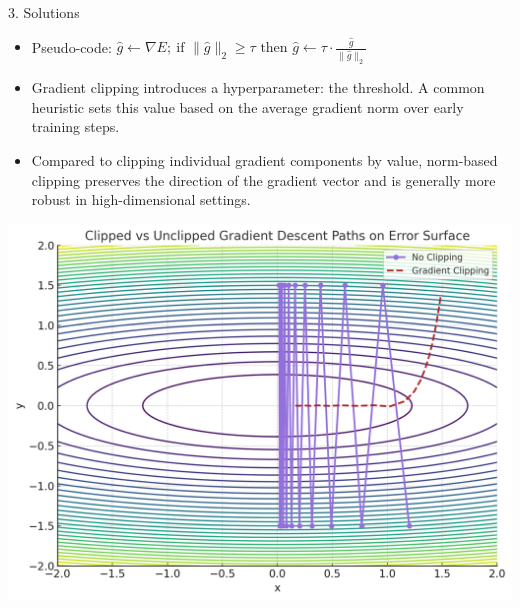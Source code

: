 \documentclass[final]{beamer}
\begin{document}
\begin{frame}[t]
\begin{columns}[t,totalwidth=\textwidth]
\begin{column}{0.3\textwidth}
\begin{block}{3. Solutions }
        \begin{minipage}{0.54\textwidth}
        \begin{itemize}
          \item Pseudo-code: $\hat{g} \leftarrow \nabla E;\ \text{if } \|\hat{g}\|_2 \geq \tau \text{ then } \hat{g} \leftarrow \tau \cdot \frac{\hat{g}}{\|\hat{g}\|_2}$
          \item Gradient clipping introduces a hyperparameter: the threshold. A common heuristic sets this value based on the average gradient norm over early training steps.
          \item Compared to clipping individual gradient components by value, norm-based clipping preserves the direction of the gradient vector and is generally more robust in high-dimensional settings.
        \end{itemize}
        \end{minipage}
        \hfill
        \begin{minipage}{0.42\textwidth}
        \centering
        \vspace{1em} %
        \includegraphics[width=\linewidth]{figures/gradient_clipping.png}
        \end{minipage}
        \vspace{1em}
        

\end{block}
\end{column}
\end{columns}
\end{frame}
\end{document}
